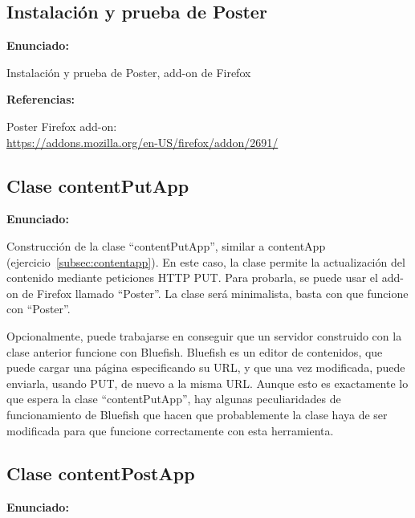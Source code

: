 \subsection{Instalación y prueba de Poster}
\label{subsec:inst-poster}

\textbf{Enunciado:}

Instalación y prueba de Poster, add-on de Firefox

\textbf{Referencias:}

Poster Firefox add-on: \\
\url{https://addons.mozilla.org/en-US/firefox/addon/2691/}

\subsection{Clase contentPutApp}
\label{subsec:contentputapp}

\textbf{Enunciado:}

Construcción de la clase ``contentPutApp'', similar a contentApp (ejercicio~\ref{subsec:contentapp}). En este caso, la clase permite la actualización del contenido mediante peticiones HTTP PUT. Para probarla, se puede usar el add-on de Firefox llamado ``Poster''. La clase será minimalista, basta con que funcione con ``Poster''.

Opcionalmente, puede trabajarse en conseguir que un servidor construido con la clase anterior funcione con Bluefish. Bluefish es un editor de contenidos, que puede cargar una página especificando su URL, y que una vez modificada, puede enviarla, usando PUT, de nuevo a la misma URL. Aunque esto es exactamente lo que espera la clase ``contentPutApp'', hay algunas peculiaridades de funcionamiento de Bluefish que hacen que probablemente la clase haya de ser modificada para que funcione correctamente con esta herramienta.

\subsection{Clase contentPostApp}
\label{subsec:contentpostapp}

\textbf{Enunciado:}

